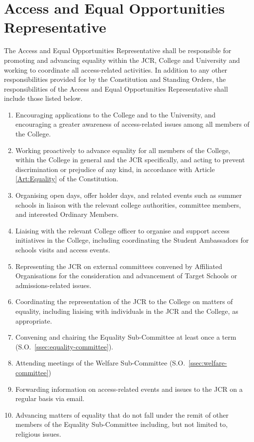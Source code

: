 \section{Access and Equal Opportunities Representative}
\npara The Access and Equal Opportunities Representative shall be responsible for promoting and advancing equality within the JCR, College and University and working to coordinate all access-related activities. 
\npara In addition to any other responsibilities provided for by the Constitution and Standing Orders, the responsibilities of the Access and Equal Opportunities Representative shall include those listed below.
\begin{enumerate}
	\item Encouraging applications to the College and to the University, and encouraging a greater awareness of access-related issues among all members of the College.     
	\item Working proactively to advance equality for all members of the College, within the College in general and the JCR specifically, and acting to prevent discrimination or prejudice of any kind, in accordance with Article \ref{Art:Equality} of the Constitution. 
	\item Organising open days, offer holder days, and related events such as summer schools in liaison with the relevant college authorities, committee members, and interested Ordinary Members.
	\item Liaising with the relevant College officer to organise and support access initiatives in the College, including coordinating the Student Ambassadors for schools visits and access events.
	\item Representing the JCR on external committees convened by Affiliated Organisations for the consideration and advancement of Target Schools or admissions-related issues.
	\item Coordinating the representation of the JCR to the College on matters of equality, including liaising with individuals in the JCR and the College, as appropriate.
	\item Convening and chairing the Equality Sub-Committee at least once a term (S.O.~\ref{ssec:equality-committee}).
	\item Attending meetings of the Welfare Sub-Committee (S.O.~\ref{ssec:welfare-committee})     
	\item Forwarding information on access-related events and issues to the JCR on a regular basis via email. 
	\item Advancing matters of equality that do not fall under the remit of other members of the Equality Sub-Committee including, but not limited to, religious issues. 

\end{enumerate}
